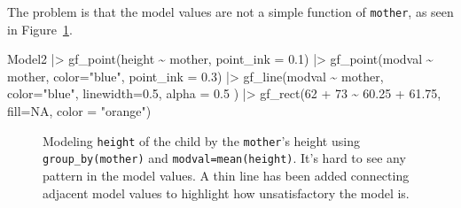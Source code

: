 \documentclass[
  letterpaper,
  DIV=11,
  numbers=noendperiod,
  oneside]{scrartcl}
\newenvironment{Shaded}{\begin{snugshade}}{\end{snugshade}}
\newcommand{\AttributeTok}[1]{\textcolor[rgb]{0.40,0.45,0.13}{#1}}
\newcommand{\ConstantTok}[1]{\textcolor[rgb]{0.56,0.35,0.01}{#1}}
\newcommand{\DecValTok}[1]{\textcolor[rgb]{0.68,0.00,0.00}{#1}}
\newcommand{\FloatTok}[1]{\textcolor[rgb]{0.68,0.00,0.00}{#1}}
\newcommand{\FunctionTok}[1]{\textcolor[rgb]{0.28,0.35,0.67}{#1}}
\newcommand{\NormalTok}[1]{\textcolor[rgb]{0.00,0.23,0.31}{#1}}
\newcommand{\SpecialCharTok}[1]{\textcolor[rgb]{0.37,0.37,0.37}{#1}}
\newcommand{\StringTok}[1]{\textcolor[rgb]{0.13,0.47,0.30}{#1}}
\begin{document}
The problem is that the model values are not a simple function of
\texttt{mother}, as seen in Figure~\ref{fig-group-by-mother}.

\begin{Shaded}
\begin{Highlighting}[]
\NormalTok{Model2 }\SpecialCharTok{|\textgreater{}} 
  \FunctionTok{gf\_point}\NormalTok{(height }\SpecialCharTok{\textasciitilde{}}\NormalTok{ mother, }\AttributeTok{point\_ink =} \FloatTok{0.1}\NormalTok{) }\SpecialCharTok{|\textgreater{}} 
  \FunctionTok{gf\_point}\NormalTok{(modval }\SpecialCharTok{\textasciitilde{}}\NormalTok{ mother, }\AttributeTok{color=}\StringTok{"blue"}\NormalTok{, }\AttributeTok{point\_ink =} \FloatTok{0.3}\NormalTok{) }\SpecialCharTok{|\textgreater{}}
  \FunctionTok{gf\_line}\NormalTok{(modval }\SpecialCharTok{\textasciitilde{}}\NormalTok{ mother, }\AttributeTok{color=}\StringTok{"blue"}\NormalTok{, }\AttributeTok{linewidth=}\FloatTok{0.5}\NormalTok{, }\AttributeTok{alpha =} \FloatTok{0.5}\NormalTok{ ) }\SpecialCharTok{|\textgreater{}}
  \FunctionTok{gf\_rect}\NormalTok{(}\DecValTok{62} \SpecialCharTok{+} \DecValTok{73} \SpecialCharTok{\textasciitilde{}} \FloatTok{60.25} \SpecialCharTok{+} \FloatTok{61.75}\NormalTok{, }\AttributeTok{fill=}\ConstantTok{NA}\NormalTok{, }\AttributeTok{color =} \StringTok{"orange"}\NormalTok{)}
\end{Highlighting}
\end{Shaded}

\begin{figure}[H]


\caption{\label{fig-group-by-mother}Modeling \texttt{height} of the
child by the \texttt{mother}'s height using \texttt{group\_by(mother)}
and \texttt{modval=mean(height)}. It's hard to see any pattern in the
model values. A thin line has been added connecting adjacent model
values to highlight how unsatisfactory the model is.}

\end{figure}%
\end{document}
